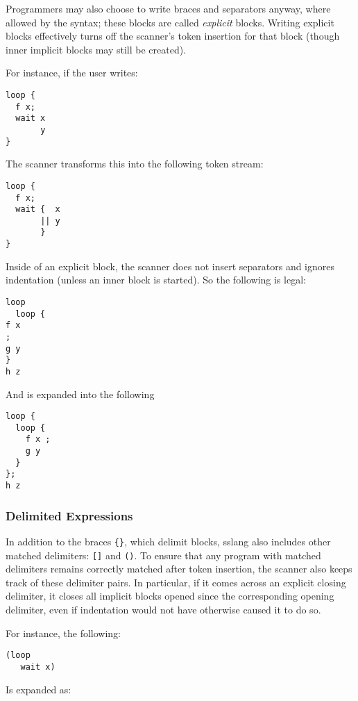 \documentclass{article}
\begin{document}
Programmers may also choose to write braces and separators anyway, where allowed by the syntax; these blocks are called \emph{explicit} blocks. Writing explicit blocks effectively turns off the scanner's token insertion for that block (though inner implicit blocks may still be created).

For instance, if the user writes:

\begin{lstlisting}
loop {
  f x;
  wait x
       y
}
\end{lstlisting}

The scanner transforms this into the following token stream:

\begin{lstlisting}
loop {
  f x;
  wait {  x
       || y
       }
}
\end{lstlisting}

Inside of an explicit block, the scanner does not insert separators and ignores indentation (unless an inner block is started). So the following is legal:

\begin{lstlisting}
loop
  loop {
f x
;
g y
}
h z
\end{lstlisting}

And is expanded into the following

\begin{lstlisting}
loop {
  loop {
    f x ;
    g y
  }
};
h z
\end{lstlisting}

\subsubsection{Delimited Expressions}

In addition to the braces \texttt{\{\}}, which delimit blocks, sslang also includes other matched delimiters: \texttt{[]} and \texttt{()}. To ensure that any program with matched delimiters remains correctly matched after token insertion, the scanner also keeps track of these delimiter pairs. In particular, if it comes across an explicit closing delimiter, it closes all implicit blocks opened since the corresponding opening delimiter, even if indentation would not have otherwise caused it to do so.

For instance, the following:

\begin{lstlisting}
(loop
   wait x)
\end{lstlisting}

Is expanded as:
\end{document}
